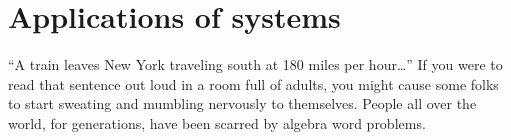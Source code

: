 %
%
%
%
%

\section{Applications of systems}
\label{sec:sysapplications}


``A train leaves New York traveling south at 180 miles per hour\ldots'' If you were to read that sentence out loud in a room full of adults, you might cause some folks to start sweating and mumbling nervously to themselves. People all over the world, for generations, have been scarred by algebra word problems.

